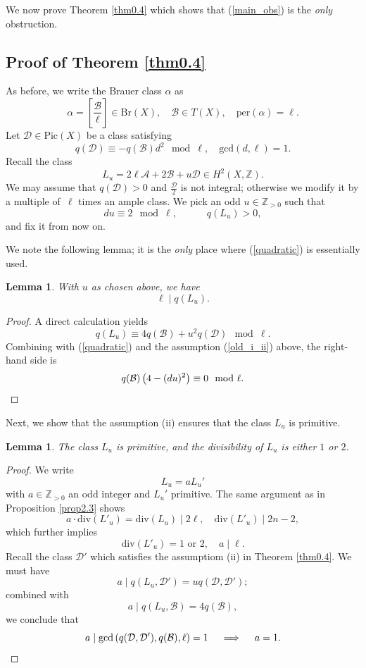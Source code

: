 \documentclass[11pt]{amsart}
\theoremstyle{plain}
\newtheorem{lem}[thm]{Lemma}
\theoremstyle{definition}
\theoremstyle{remark}
\newcommand{\BZ}{{\mathbb{Z}}}
\newcommand{\CA}{{\mathcal A}}
\newcommand{\CB}{{\mathcal B}}
\newcommand{\CD}{{\mathcal D}}
\begin{document}
We now prove Theorem \ref{thm0.4} which shows that (\ref{main_obs}) is the \emph{only} obstruction.

\subsection{Proof of Theorem \ref{thm0.4}}


As before, we write the Brauer class $\alpha$ as
\[
\alpha = \left[\frac{\CB}{\ell}\right] \in \mathrm{Br}(X), \quad \CB \in T(X), \quad \mathrm{per}(\alpha) = \ell.
\]
Let $\CD \in \mathrm{Pic}(X)$ be a class satisfying  \begin{equation}\label{quadratic}
q(\CD) \equiv -q(\CB)d^2 \mod \ell, \quad \mathrm{gcd}(d,\ell) =1.
\end{equation}
Recall the class
\[
L_u = 2\ell  \CA + 2\CB + u\CD \in H^2(X, \BZ).
\]
We may assume that $q(\CD) >0$ and $\frac{\CD}{2}$ is not integral; otherwise we modify it by a multiple of~$\ell$ times an ample class. We pick an odd $u \in \BZ_{>0}$ such that
\begin{equation}\label{old_i_ii}
du \equiv 2 \mod \ell, \quad \quad  \quad q(L_u)>0,
\end{equation}
and fix it from now on. 

We note the following lemma; it is the \emph{only} place where (\ref{quadratic}) is essentially used.

\begin{lem}\label{lem2.4}
With $u$ as chosen above, we have 
    \[
    \ell \mid q(L_u).
    \]
\end{lem}

\begin{proof}
A direct calculation yields
\[
q(L_u) \equiv 4q(\CB) + u^2q(\CD) \mod \ell.
\]
Combining with (\ref{quadratic}) and the assumption (\ref{old_i_ii}) above, the right-hand side is
\[
q(\CB)\left( 4- (du)^2 \right) \equiv 0 \mod \ell. \qedhere
\]
\end{proof}

Next, we show that the assumption (ii) ensures that the class $L_u$ is primitive.

\begin{lem}
    The class $L_u$ is primitive, and the divisibility of $L_u$ is either $1$ or $2$.
\end{lem}

\begin{proof}
We write
\[
L_u = a L_u'
\]
with $a\in \BZ_{>0}$ an odd integer and $L_u'$ primitive. The same argument as in Proposition \ref{prop2.3} shows 
\[
a\cdot\mathrm{div}(L'_u)= \mathrm{div}(L_u) \mid 2\ell, \quad \mathrm{div}(L'_u) \mid 2n-2,
\]
which further implies 
\[
\mathrm{div}(L'_u) = 1 \textrm{ or } 2, \quad a \mid \ell.
\]
Recall the class $\CD'$ which satisfies the assumptiom (ii) in Theorem \ref{thm0.4}. We must have
\[
a \mid q(L_u, \CD') = u q(\CD, \CD');
\]
combined with 
\[
a \mid q(L_u, \CB) = 4q(\CB),
\]
we conclude that
\[
a \mid \mathrm{gcd}\left(q(\CD, \CD'), q(\CB), \ell \right) =1 ~~~\implies~~~ a=1. \qedhere
\]
\end{proof}
\end{document}
